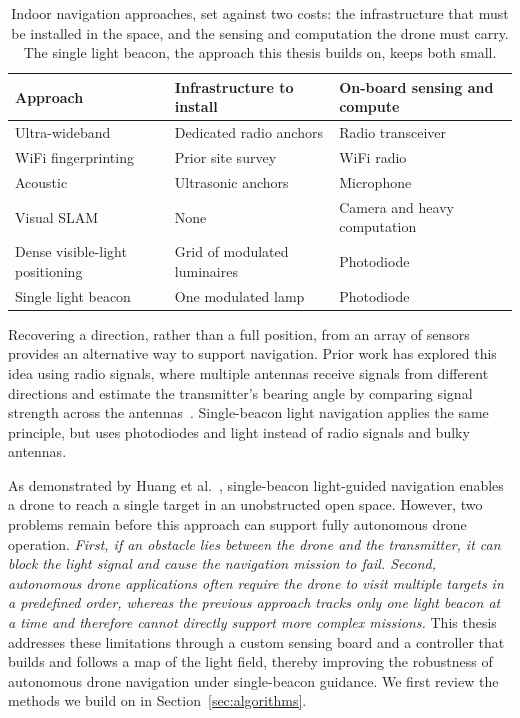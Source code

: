 \begin{table}[ht]
    \centering
    \caption{Indoor navigation approaches, set against two costs: the infrastructure that must be installed in the space, and the sensing and computation the drone must carry. The single light beacon, the approach this thesis builds on, keeps both small.}
    \label{tab:methods-comparison}
    \setlength{\tabcolsep}{4pt}
    \begin{tabular}{p{3.3cm} p{3.8cm} p{3.8cm}}
        \hline
        Approach & Infrastructure to install & On-board sensing and compute \\
        \hline
        Ultra-wideband                  & Dedicated radio anchors        & Radio transceiver \\
        WiFi fingerprinting             & Prior site survey              & WiFi radio \\
        Acoustic                        & Ultrasonic anchors             & Microphone \\
        Visual SLAM                     & None                           & Camera and heavy computation \\
        Dense visible-light positioning & Grid of modulated luminaires   & Photodiode \\
        Single light beacon             & One modulated lamp             & Photodiode \\
        \hline
    \end{tabular}
\end{table}

Recovering a direction, rather than a full position, from an array of sensors provides an alternative way to support navigation. Prior work has explored this idea using radio signals, where multiple antennas receive signals from different directions and estimate the transmitter's bearing angle by comparing signal strength across the antennas~\cite{iqbal2020amplitude}. Single-beacon light navigation applies the same principle, but uses photodiodes and light instead of radio signals and bulky antennas.


As demonstrated by Huang et al.~\cite{huang2026lta}, single-beacon light-guided navigation enables a drone to reach a single target in an unobstructed open space. However, two problems remain before this approach can support fully autonomous drone operation. \textit{First, if an obstacle lies between the drone and the transmitter, it can block the light signal and cause the navigation mission to fail. Second, autonomous drone applications often require the drone to visit multiple targets in a predefined order, whereas the previous approach tracks only one light beacon at a time and therefore cannot directly support more complex missions.} This thesis addresses these limitations through a custom sensing board and a controller that builds and follows a map of the light field, thereby improving the robustness of autonomous drone navigation under single-beacon guidance. We first review the methods we build on in Section~\ref{sec:algorithms}.


